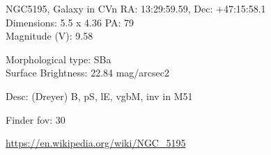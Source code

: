 \begin{block}{NGC5195, Galaxy in CVn}
    RA: 13:29:59.59, Dec: +47:15:58.1 \\ 
    Dimensions: 5.5 x 4.36 PA: 79 \\ 
    Magnitude (V): 9.58

    Morphological type: SBa \\ 
    Surface Brightness: 22.84 mag/arcsec2 

    Desc: (Dreyer) B, pS, lE, vgbM, inv in M51 

    Finder fov: 30 

    \url{https://en.wikipedia.org/wiki/NGC_5195} 
\end{block}
